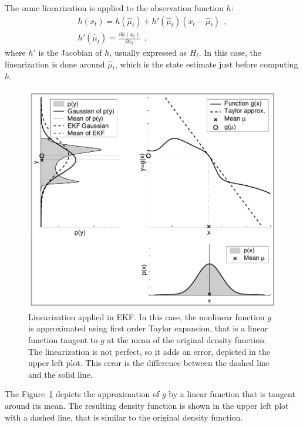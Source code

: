 The same linearization is applied to the observation function $h$:
\begin{align}
    h\left(x_t\right) = h\left(\hat\mu_t\right) + h'\left(\hat\mu_t\right)\left(x_t - \hat\mu_t\right)~~, \\
    h'\left(\hat\mu_t\right) = \frac{\partial h\left(x_t\right)}{\partial x_t}~~,
\end{align}
where $h'$ is the Jacobian of $h$, usually expressed as $H_t$. In this case, the linearization is done around $\hat\mu_t$, which is the state estimate just before computing $h$.\\
\begin{figure}
    \centering
    \includegraphics{Images/fig2-ekf-linearization.png}
    \caption[Linearization applied in EKF]{Linearization applied in \ac{EKF}. In this case, the nonlinear function $g$ is approximated using first order Taylor expansion, that is a linear function tangent to $g$ at the mean of the original density function. The linearization is not perfect, so it adds an error, depicted in the upper left plot. This error is the difference between the dashed line and the solid line. \cite{prob-robotics}}
    \label{fig:chapter1:kf:ekf:ekf-linearization}
\end{figure}

The Figure~\ref{fig:chapter1:kf:ekf:ekf-linearization} depicts the approximation of $g$ by a linear function that is tangent around its mean. The resulting density function is shown in the upper left plot with a dashed line, that is similar to the original density function.\\

